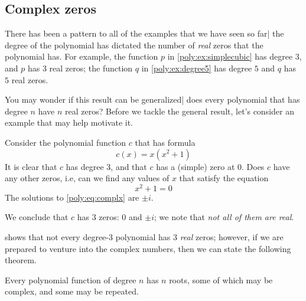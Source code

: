  \subsection*{Complex zeros}
	 There has been a pattern to all of the examples that we have seen so far|
	 the degree of the polynomial has dictated the number of \emph{real} zeros that the
	 polynomial has. For example, the function $p$ in \cref{poly:ex:simplecubic}
	 has degree $3$, and $p$ has $3$ real zeros; the function $q$ in \cref{poly:ex:degree5}
	 has degree $5$ and $q$ has $5$ real zeros.

	 You may wonder if this result can be generalized| does every polynomial that
	 has degree $n$ have $n$ real zeros? Before we tackle the general result,
	 let's consider an example that may help motivate it.
	 \begin{pccexample}\label{poly:ex:complx}
		 Consider the polynomial function $c$ that has formula
		 \[
			 c(x)=x(x^2+1)
		 \]
		 It is clear that $c$ has degree $3$, and that $c$ has a (simple) zero at $0$. Does
		 $c$ have any other zeros, i.e, can we find any values of $x$ that satisfy the equation
		 \begin{equation}\label{poly:eq:complx}
			 x^2+1=0
		 \end{equation}
		 The solutions to \cref{poly:eq:complx} are $\pm i$.

		 We conclude that $c$ has $3$ zeros: $0$ and $\pm i$; we note that \emph{not
			 all of them are real}.
	 \end{pccexample}
	  shows that not every degree-$3$ polynomial has $3$
	 \emph{real} zeros; however, if we are prepared to venture into the complex numbers,
	 then we can state the following theorem.
	 \begin{pccspecialcomment}
		 Every polynomial function of degree $n$ has $n$ roots, some of which may
		 be complex, and some may be repeated.
	 \end{pccspecialcomment}
